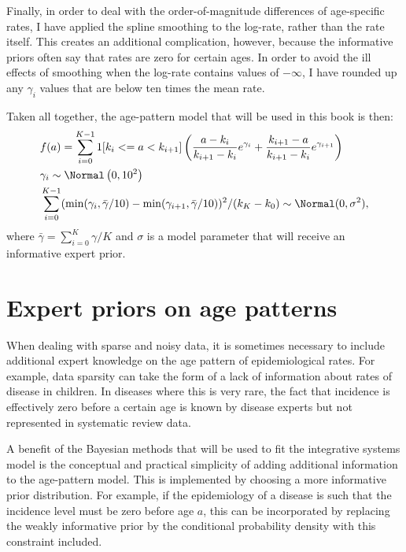 Finally, in order to deal with the order-of-magnitude differences of
age-specific rates, I have applied the spline smoothing to the
log-rate, rather than the rate itself.  This creates an additional
complication, however, because the informative priors often say that
rates are zero for certain ages.  In order to avoid the ill effects of
smoothing when the log-rate contains values of $-\infty$, I have
rounded up any $\gamma_i$ values that are below ten times the mean
rate.


Taken all together, the age-pattern model that will be used in this
book is then:
\begin{align*}
&f(a) = \sum_{i=0}^{K-1} 1[k_i <= a < k_{i+1}]\left( \frac{a-k_i}{k_{i+1}-k_i} e^{\gamma_i} + \frac{k_{i+1}-a}{k_{i+1}-k_i} e^{\gamma_{i+1}}\right)\\
&\gamma_i \sim \Normal\left(0, 10^2\right)\\
&\sum_{i=0}^{K-1}(\min(\gamma_i, \bar\gamma/10) - \min(\gamma_{i+1}, \bar\gamma/10))^2/(k_K-k_0) \sim \Normal(0, \sigma^2),\\
\end{align*} 
where $\bar\gamma = \sum_{i=0}^K \gamma/K$ and $\sigma$ is a model parameter that will receive an informative expert prior.




\section{Expert priors on age patterns}

When dealing with sparse and noisy data, it is sometimes necessary to
include additional expert knowledge on the age pattern of
epidemiological rates.  For example, data sparsity can take the form
of a lack of information about rates of disease in children.  In
diseases where this is very rare, the fact that incidence is
effectively zero before a certain age is known by disease experts but
not represented in systematic review data.

A benefit of the Bayesian methods that will be used to fit the
integrative systems model is the conceptual and practical simplicity
of adding additional information to the age-pattern model.  This is
implemented by choosing a more informative prior distribution.  For
example, if the epidemiology of a disease is such that the incidence
level must be zero before age $a$, this can be incorporated by
replacing the weakly informative prior by the conditional probability
density with this constraint included.

